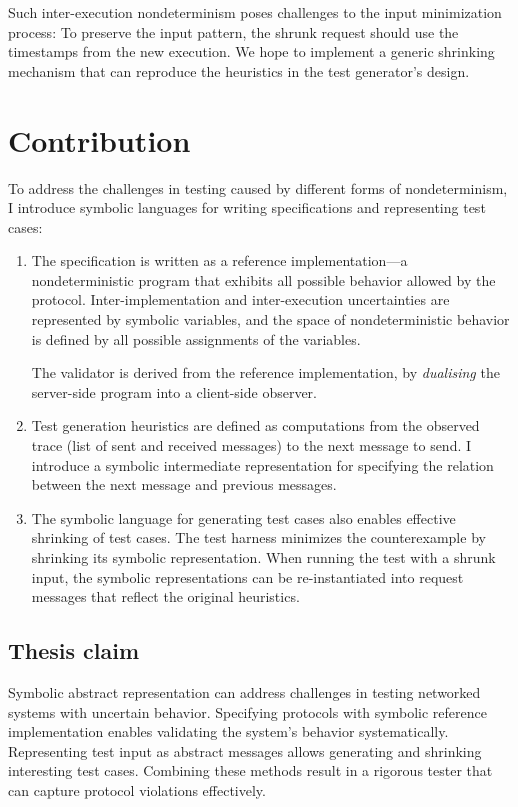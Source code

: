 Such inter-execution nondeterminism poses challenges to the input minimization
process: To preserve the input pattern, the shrunk \http request should use the
timestamps from the new execution.  We hope to implement a generic shrinking
mechanism that can reproduce the heuristics in the test generator's design.

\section{Contribution}
\label{sec:contribution}
To address the challenges in testing caused by different forms of
nondeterminism, I introduce symbolic languages for writing specifications and
representing test cases:

\begin{enumerate}
\item The specification is written as a reference implementation---a
nondeterministic program that exhibits all possible behavior allowed by
the protocol.  Inter-implementation and inter-execution uncertainties are
represented by symbolic variables, and the space of nondeterministic behavior is
defined by all possible assignments of the variables.

The validator is derived from the reference implementation, by {\em
  dualising} the server-side program into a client-side observer.

\item Test generation heuristics are defined as computations from the observed
trace (list of sent and received messages) to the next message to send.  I
introduce a symbolic intermediate representation for specifying the relation
between the next message and previous messages.

\item The symbolic language for generating test cases also enables effective
shrinking of test cases.  The test harness minimizes the counterexample by
shrinking its symbolic representation.  When running the test with a shrunk
input, the symbolic representations can be re-instantiated into request messages
that reflect the original heuristics.
\end{enumerate}

\subsection*{Thesis claim}
Symbolic abstract representation can address challenges in testing networked
systems with uncertain behavior.  Specifying protocols with symbolic reference
implementation enables validating the system's behavior systematically.
Representing test input as abstract messages allows generating and shrinking
interesting test cases.  Combining these methods result in a rigorous tester
that can capture protocol violations effectively.

